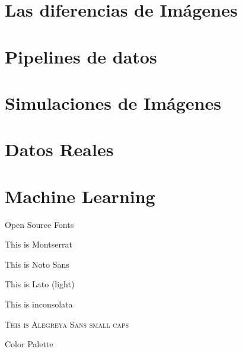 \documentclass[14pt]{beamer}
\begin{document}
\section{Las diferencias de Im\'agenes}
\section{Pipelines de datos}
\section{Simulaciones de Im\'agenes}
\section{Datos Reales}
\section{Machine Learning}




\begin{frame}{Open Source Fonts}
 \begin{fullpageitemize}
  \item {\montserratfont This is Montserrat}
  \item {\notosansfont This is Noto Sans}
  \item {\latolightfont This is Lato (light)}
  \item {\inconsolatafont This is inconsolata}
  \item \textsc{This is Alegreya Sans small caps}
 \end{fullpageitemize}
\end{frame}

\begin{frame}{Color Palette}
 \begin{center}
  \crule[colordgray] \crule[colorhgray] \crule[colorblue] \crule[colorgreen] \crule[colororange]
 \end{center}
\end{frame}


\end{document}
